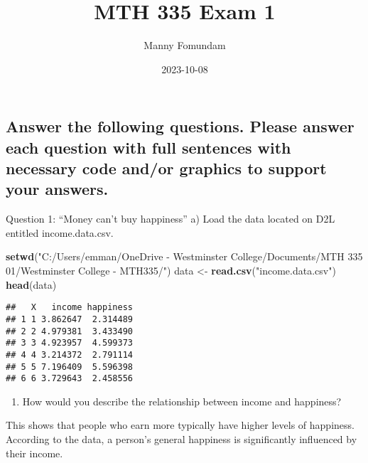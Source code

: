 \documentclass[
]{article}
\title{MTH 335 Exam 1}
\author{Manny Fomundam}
\date{2023-10-08}
\newenvironment{Shaded}{\begin{snugshade}}{\end{snugshade}}
\newcommand{\FunctionTok}[1]{\textcolor[rgb]{0.13,0.29,0.53}{\textbf{#1}}}
\newcommand{\NormalTok}[1]{#1}
\newcommand{\OtherTok}[1]{\textcolor[rgb]{0.56,0.35,0.01}{#1}}
\newcommand{\StringTok}[1]{\textcolor[rgb]{0.31,0.60,0.02}{#1}}
\providecommand{\tightlist}{%
  \setlength{\itemsep}{0pt}\setlength{\parskip}{0pt}}
\begin{document}
\maketitle

\hypertarget{answer-the-following-questions.-please-answer-each-question-with-full-sentences-with-necessary-code-andor-graphics-to-support-your-answers.}{%
\subsection{Answer the following questions. Please answer each question
with full sentences with necessary code and/or graphics to support your
answers.}\label{answer-the-following-questions.-please-answer-each-question-with-full-sentences-with-necessary-code-andor-graphics-to-support-your-answers.}}

Question 1: ``Money can't buy happiness'' a) Load the data located on
D2L entitled income.data.csv.

\begin{Shaded}
\begin{Highlighting}[]
\FunctionTok{setwd}\NormalTok{(}\StringTok{"C:/Users/emman/OneDrive {-} Westminster College/Documents/MTH 335 01/Westminster College {-} MTH335/"}\NormalTok{)}
\NormalTok{data }\OtherTok{\textless{}{-}} \FunctionTok{read.csv}\NormalTok{(}\StringTok{"income.data.csv"}\NormalTok{)}
\FunctionTok{head}\NormalTok{(data)}
\end{Highlighting}
\end{Shaded}

\begin{verbatim}
##   X   income happiness
## 1 1 3.862647  2.314489
## 2 2 4.979381  3.433490
## 3 3 4.923957  4.599373
## 4 4 3.214372  2.791114
## 5 5 7.196409  5.596398
## 6 6 3.729643  2.458556
\end{verbatim}

\begin{enumerate}
\def\labelenumi{\alph{enumi})}
\setcounter{enumi}{1}
\tightlist
\item
  How would you describe the relationship between income and happiness?
\end{enumerate}

This shows that people who earn more typically have higher levels of
happiness. According to the data, a person's general happiness is
significantly influenced by their income.
\end{document}
